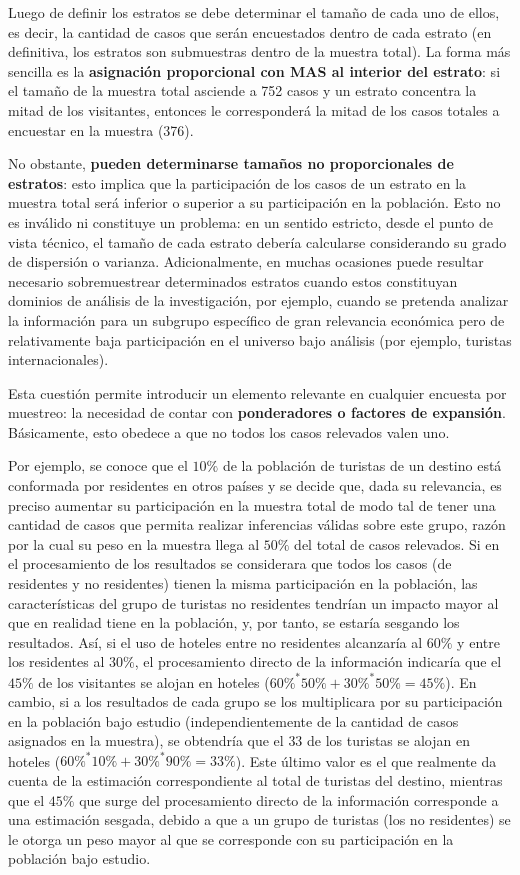 \documentclass[
]{book}
\begin{document}
Luego de definir los estratos se debe determinar el tamaño de cada uno de ellos, es decir, la cantidad de casos que serán encuestados dentro de cada estrato (en definitiva, los estratos son submuestras dentro de la muestra total). La forma más sencilla es la \textbf{asignación proporcional con MAS al interior del estrato}: si el tamaño de la muestra total asciende a 752 casos y un estrato concentra la mitad de los visitantes, entonces le corresponderá la mitad de los casos totales a encuestar en la muestra (376).

No obstante, \textbf{pueden determinarse tamaños no proporcionales de estratos}: esto implica que la participación de los casos de un estrato en la muestra total será inferior o superior a su participación en la población. Esto no es inválido ni constituye un problema: en un sentido estricto, desde el punto de vista técnico, el tamaño de cada estrato debería calcularse considerando su grado de dispersión o varianza. Adicionalmente, en muchas ocasiones puede resultar necesario sobremuestrear determinados estratos cuando estos constituyan dominios de análisis de la investigación, por ejemplo, cuando se pretenda analizar la información para un subgrupo específico de gran relevancia económica pero de relativamente baja participación en el universo bajo análisis (por ejemplo, turistas internacionales).

Esta cuestión permite introducir un elemento relevante en cualquier encuesta por muestreo: la necesidad de contar con \textbf{ponderadores o factores de expansión}. Básicamente, esto obedece a que no todos los casos relevados valen uno.

Por ejemplo, se conoce que el \(10\%\) de la población de turistas de un destino está conformada por residentes en otros países y se decide que, dada su relevancia, es preciso aumentar su participación en la muestra total de modo tal de tener una cantidad de casos que permita realizar inferencias válidas sobre este grupo, razón por la cual su peso en la muestra llega al \(50\%\) del total de casos relevados. Si en el procesamiento de los resultados se considerara que todos los casos (de residentes y no residentes) tienen la misma participación en la población, las características del grupo de turistas no residentes tendrían un impacto mayor al que en realidad tiene en la población, y, por tanto, se estaría sesgando los resultados. Así, si el uso de hoteles entre no residentes alcanzaría al \(60\%\) y entre los residentes al \(30\%\), el procesamiento directo de la información indicaría que el \(45\%\) de los visitantes se alojan en hoteles (\(60\%^*50\%+30\%^*50\%=45\%\)). En cambio, si a los resultados de cada grupo se los multiplicara por su participación en la población bajo estudio (independientemente de la cantidad de casos asignados en la muestra), se obtendría que el \(33%
\) de los turistas se alojan en hoteles (\(60\%^*10\%+30\%^*90\%=33\%\)). Este último valor es el que realmente da cuenta de la estimación correspondiente al total de turistas del destino, mientras que el \(45\%\) que surge del procesamiento directo de la información corresponde a una estimación sesgada, debido a que a un grupo de turistas (los no residentes) se le otorga un peso mayor al que se corresponde con su participación en la población bajo estudio.
\end{document}
